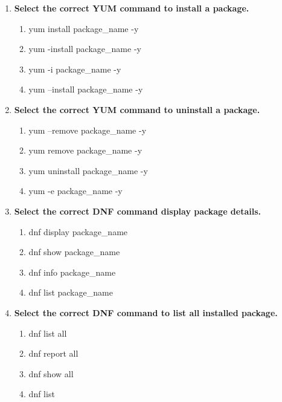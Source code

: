 \begin{flushleft}
\begin{enumerate}
		\item \textbf{Select the correct YUM command to install a package.}
		\begin{enumerate}[label=(\alph*)]
			\item yum install package\_name -y %
			\item yum -install package\_name -y 
			\item yum -i package\_name -y 
			\item yum --install package\_name -y 
		\end{enumerate}
		\bigskip
		\bigskip	

		\item \textbf{Select the correct YUM command to uninstall a package.}
		\begin{enumerate}[label=(\alph*)]
			\item yum --remove package\_name -y 
			\item yum remove package\_name -y %
			\item yum uninstall package\_name -y
			\item yum -e package\_name -y
		\end{enumerate}
		\bigskip
		\bigskip	
		
		
		\item \textbf{Select the correct DNF command display package details.}
		\begin{enumerate}[label=(\alph*)]
			\item dnf display package\_name
			\item dnf show package\_name
			\item dnf info package\_name   %
			\item dnf list package\_name
		\end{enumerate}
		\bigskip
		\bigskip	

		\item \textbf{Select the correct DNF command to list all installed package.}
		\begin{enumerate}[label=(\alph*)]
			\item dnf list all   %
			\item dnf report all
			\item dnf show all
			\item dnf list
		\end{enumerate}
		\bigskip
		\bigskip	

		
	\end{enumerate}
	
	
\end{flushleft}

\newpage

